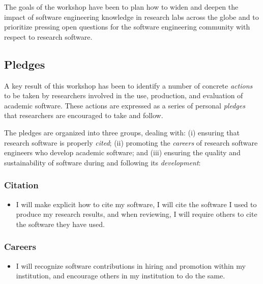\documentclass[a4paper,UKenglish]{dagman}
\renewcommand{\paragraph}[1]{\subsubsection*{#1}\xspace}
\begin{document}
The goals of the workshop have been to plan how to widen and deepen the impact of software engineering knowledge in research labs across the globe and to prioritize pressing open questions for the software engineering community with respect to research software.

\subsection{Pledges}

A key result of this workshop has been to identify a number of concrete \emph{actions} to be taken by researchers involved in the use, production, and evaluation of academic software. These actions are expressed as a series of personal \emph{pledges} that researchers are encouraged to take and follow.

The pledges are organized into three groups, dealing with:
(i) ensuring that research software is properly \emph{cited};
(ii) promoting the \emph{careers} of research software engineers who develop academic software;
and
(iii) ensuring the quality and sustainability of software during and following its \emph{development}:

\paragraph{Citation}
\begin{itemize}
\item I will make explicit how to cite my software, I will cite the software I used to produce my research results, and when reviewing, I will require others to cite the software they have used. 
\end{itemize}

\paragraph{Careers}
\begin{itemize}
\item I will recognize software contributions in hiring and promotion within my institution, and encourage others in my institution to do the same.
\end{itemize}

\end{document}

